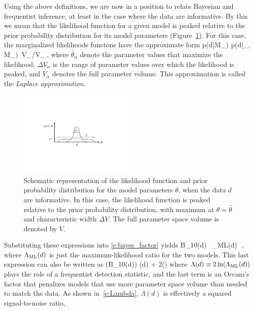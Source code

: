 Using the above definitions, we are now in a position to 
relate Bayesian and frequentist inference, at least in the 
case where the data are informative.
By this we mean that the likelihood function for a given
model is peaked relative to the prior probability 
distribution for its model parameters 
(Figure~\ref{f:informative_data}).
For this case, the marginalized likelihoods functons 
have the approximate form 
%
\be
p(d|{\cal M}_\alpha) 
\simeq
p(d|\hat\theta_\alpha, {\cal M}_\alpha)
\,{\Delta V_\alpha}/{V_\alpha}\,,
\ee
%
where $\hat\theta_\alpha$ denote the parameter values that
maximize the likelihood, $\Delta V_\alpha$ is the range of
parameter values over which the likelihood is peaked, and 
$V_\alpha$ denotes the full parameter volume.
This approximation is called the {\em Laplace approximation}.
%
\begin{figure}[htbp!]
\begin{center}
\includegraphics[width=0.5\textwidth]{Figures/informative_data}
\caption{Schematic representation of the likelihood function and 
prior probability distribution for the model parameters $\theta$,
when the data $d$ are informative.
In this case, the likelihood function is peaked relative to the 
prior probability distribution, with maximum at 
$\theta=\hat\theta$ and characteristic width $\Delta V$.
The full parameter space volume is denoted by $V$.}
\label{f:informative_data}
\end{center}
\end{figure}
%
Substituting these expressions into \eqref{e:bayes_factor} yields
%
\be
{\cal B}_{10}(d) 
\equiv{}
\simeq {}
\,
\simeq\Lambda_{\rm ML}(d)
\,\,,
\ee
where $\Lambda_{\rm ML}(d)$ is just the maximum-likelihood
ratio for the two models.
This last expression can also be written as
%
\ln({\cal B}_{10}(d)) \simeq \Lambda(d) + 
2\ln\left(\right)
\ee
%
where $\Lambda(d)\equiv 2\ln(\Lambda_{\rm ML}(d))$
plays the role of a frequentist detection statistic, 
and the last term is an Occam's factor that penalizes
models that use more parameter space volume than needed
to match the data.
As shown in~\eqref{e:Lambda}, $\Lambda(d)$ is effectively
a squared signal-to-noise ratio,


